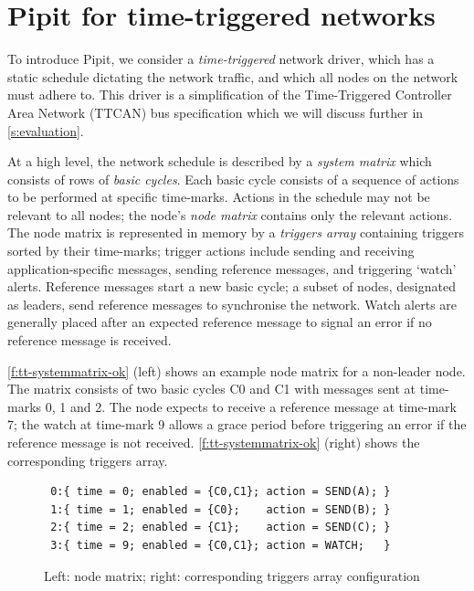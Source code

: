 \documentclass[a4paper,UKenglish,cleveref, autoref, thm-restate,anonymous]{lipics-v2021}
\begin{document}
\section{Pipit for time-triggered networks}
\label{s:motivation}

To introduce Pipit, we consider a \emph{time-triggered} network driver, which has a static schedule dictating the network traffic, and which all nodes on the network must adhere to.
This driver is a simplification of the Time-Triggered Controller Area Network (TTCAN) bus specification \cite{fuehrer2001time} which we will discuss further in \autoref{s:evaluation}.

At a high level, the network schedule is described by a \emph{system matrix} which consists of rows of \emph{basic cycles}.
Each basic cycle consists of a sequence of actions to be performed at specific time-marks.
Actions in the schedule may not be relevant to all nodes; the node's \emph{node matrix} contains only the relevant actions.
The node matrix is represented in memory by a \emph{triggers array} containing triggers sorted by their time-marks; trigger actions include sending and receiving application-specific messages, sending reference messages, and triggering `watch' alerts.
Reference messages start a new basic cycle; a subset of nodes, designated as leaders, send reference messages to synchronise the network.
Watch alerts are generally placed after an expected reference message to signal an error if no reference message is received.

\autoref{f:tt-systemmatrix-ok} (left) shows an example node matrix for a non-leader node.
The matrix consists of two basic cycles C0 and C1 with messages sent at time-marks 0, 1 and 2.
The node expects to receive a reference message at time-mark 7; the watch at time-mark 9 allows a grace period before triggering an error if the reference message is not received.
\autoref{f:tt-systemmatrix-ok} (right) shows the corresponding triggers array.

\begin{figure}
  \begin{minipage}{0.5\textwidth}
\end{minipage}
\begin{minipage}{0.49\textwidth}
\scriptsize
\begin{verbatim}
 0:{ time = 0; enabled = {C0,C1}; action = SEND(A); }
 1:{ time = 1; enabled = {C0};    action = SEND(B); }
 2:{ time = 2; enabled = {C1};    action = SEND(C); }
 3:{ time = 9; enabled = {C0,C1}; action = WATCH;   }
\end{verbatim}
\end{minipage}

\caption{Left: node matrix; right: corresponding triggers array configuration}
\label{f:tt-systemmatrix-ok}
\end{figure}
\end{document}

